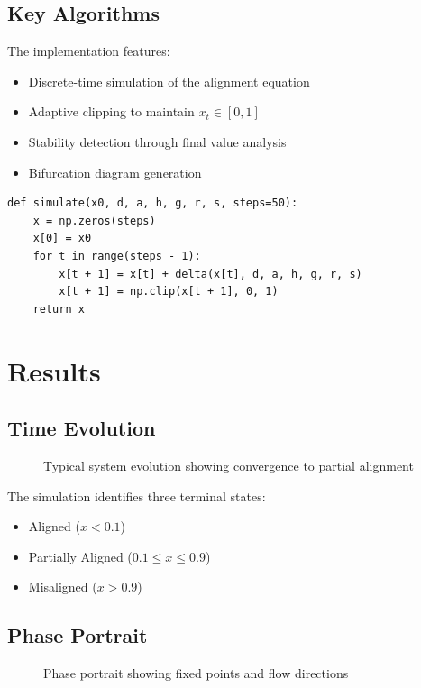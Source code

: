 \documentclass[a4paper, 12pt]{article}
\begin{document}
\subsection{Key Algorithms}
The implementation features:
\begin{itemize}
	\item Discrete-time simulation of the alignment equation
	\item Adaptive clipping to maintain $x_t \in [0,1]$
	\item Stability detection through final value analysis
	\item Bifurcation diagram generation
\end{itemize}

\begin{lstlisting}[caption=Core Simulation Code]
def simulate(x0, d, a, h, g, r, s, steps=50):
    x = np.zeros(steps)
    x[0] = x0
    for t in range(steps - 1):
        x[t + 1] = x[t] + delta(x[t], d, a, h, g, r, s)
        x[t + 1] = np.clip(x[t + 1], 0, 1)
    return x
\end{lstlisting}

\section{Results}
\subsection{Time Evolution}
\begin{figure}[h]
	\centering
	\caption{Typical system evolution showing convergence to partial alignment}
\end{figure}

The simulation identifies three terminal states:
\begin{itemize}
	\item Aligned ($x < 0.1$)
	\item Partially Aligned ($0.1 \leq x \leq 0.9$)
	\item Misaligned ($x > 0.9$)
\end{itemize}

\subsection{Phase Portrait}
\begin{figure}[h]
	\centering
	\caption{Phase portrait showing fixed points and flow directions}
\end{figure}
\end{document}

